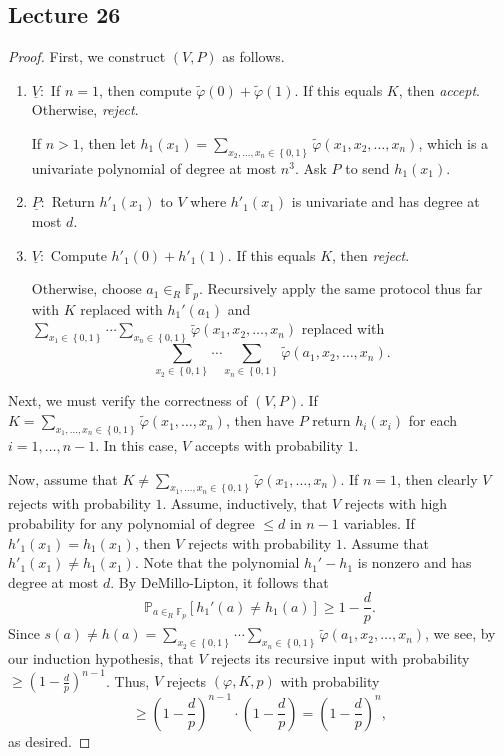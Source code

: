 \documentclass[10pt,letterpaper,cm]{nupset}
\theoremstyle{definition}
\theoremstyle{theorem}
\theoremstyle{remark}
\newcommand{\F}{\mathbb F}
\newcommand{\1}{\mathbf{1}}
\newcommand{\0}{\vec 0}
\begin{document}
\subsection{Lecture 26}

\begin{proof} 
First, we construct $(V, P)$ as follows. 
\begin{enumerate}
\item $\underline{V}:$ If $n=1$, then compute $\tilde{\varphi}(0) + \tilde{\varphi}(1)$. If this equals $K$, then \textit{accept}. Otherwise, \textit{reject}. 

If $n>1$, then let $h_1(x_1) = \sum_{x_2, \ldots, x_n \in \left\{0,1\right\}} \tilde{\varphi}(x_1, x_2, \ldots, x_n)$, which is a univariate polynomial of degree at most $n^3$. Ask $P$ to send $h_1(x_1)$. 
\item $\underline{P}:$ Return  $h'_1(x_1)$ to $V$ where $h'_1(x_1)$ is univariate and has degree at most $d$. 
\item $\underline{V}:$ Compute $h'_1(0) + h'_1(1)$. If this equals $K$, then \textit{reject}. 

Otherwise,  choose $a_1 \in_R \F_p$. Recursively apply the same protocol thus far with $K$ replaced with $h_1'(a_1)$ and $ \sum_{x_1 \in \left\{0,1\right\}} \cdots \sum_{x_n \in \left\{0,1\right\}} \tilde{\varphi}(x_1, x_2, \ldots, x_n)$ replaced with $$\sum_{x_2 \in \left\{0,1\right\}} \cdots \sum_{x_n \in \left\{0,1\right\}} \tilde{\varphi}(a_1, x_2, \ldots, x_n).$$
\end{enumerate}
Next, we must verify the correctness of $(V,P)$. If $K = \sum_{x_1, \ldots, x_n \in \left\{0,1\right\}} \tilde{\varphi}(x_1, \ldots, x_n)$, then have $P$ return $h_i(x_i)$ for each $i=1, \ldots, {n-1}$. In this case, $V$ accepts with probability $1$. 

\medskip

 Now, assume that $K \ne \sum_{x_1, \ldots, x_n \in \left\{0,1\right\}} \tilde{\varphi}(x_1, \ldots, x_n)$.  If $n=1$, then clearly $V$ rejects with probability $1$. Assume, inductively, that $V$ rejects with high probability for any polynomial of degree $\leq d$ in $n-1$ variables. If $h'_1(x_1) = h_1(x_1)$, then $V$ rejects with probability $1$. Assume that $h'_1(x_1) \ne h_1(x_1)$.  Note that the polynomial $h_1' - h_1$ is nonzero and has degree at most $d$.  By DeMillo-Lipton, it follows that  $$\mathbb{P}_{a \in_R \F_p} [h_1'(a) \ne h_1(a)] \geq 1- \frac{d}{p}.$$ Since $s(a) \ne h(a) = \sum_{x_2 \in \left\{0,1\right\}} \cdots \sum_{x_n \in \left\{0,1\right\}} \tilde{\varphi}(a_1, x_2, \ldots, x_n)$, we see, by our induction hypothesis, that $V$ rejects its recursive input with probability $\geq (1-\frac{d}{p})^{n-1}$. Thus, $V$ rejects $(\varphi, K, p)$ with probability $$ \geq \left(1-\frac{d}{p}\right)^{n-1} \cdot \left(1-\frac{d}{p}\right) = \left(1-\frac{d}{p}\right)^{n},$$ as desired.
\end{proof}
\end{document}
